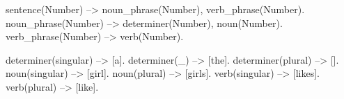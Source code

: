 sentence(Number) --> noun_phrase(Number), verb_phrase(Number).
noun_phrase(Number) --> determiner(Number), noun(Number).
verb_phrase(Number) --> verb(Number).

determiner(singular) --> [a].
determiner(_)   --> [the].
determiner(plural)   --> [].
noun(singular) --> [girl].
noun(plural)   --> [girls].
verb(singular) --> [likes].
verb(plural)   --> [like].

